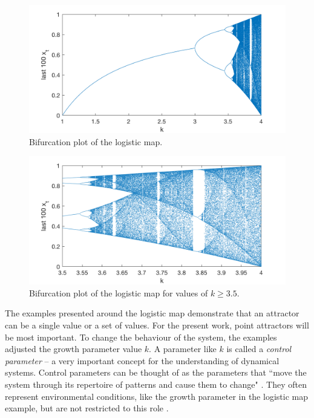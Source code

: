 \begin{figure}
\includegraphics[width=\textwidth]{figures/ch3/logistic_map_bifurcation.png}
\caption{Bifurcation plot of the logistic map.}
\label{fig:logistic_map_bifurcation}
\end{figure}

\begin{figure}
\includegraphics[width=\textwidth]{figures/ch3/logistic_map_bifurcation_zoom.png}
\caption{Bifurcation plot of the logistic map for values of $k \geq 3.5$.}
\label{fig:logistic_map_bifurcation_zoom}
\end{figure}

The examples presented around the logistic map demonstrate that an attractor can be a single value or a set of values. For the present work, point attractors will be most important. To change the behaviour of the system, the examples adjusted the growth parameter value $k$. A parameter like $k$ is called a \emph{control parameter} -- a very important concept for the understanding of dynamical systems. Control parameters can be thought of as the parameters that ``move the system through its repertoire of patterns and cause them to change" \citep[1538]{Kelso2013}. They often represent environmental conditions, like the growth parameter in the logistic map example, but are not restricted to this role \citep{Kelso2013}. 

